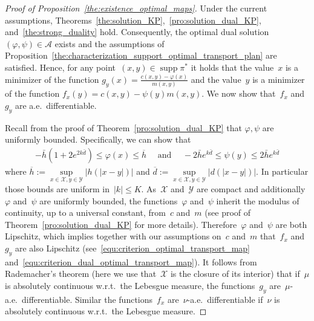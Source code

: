 \documentclass{article}
\theoremstyle{definition}
\DeclareMathOperator{\supp}{supp}
\begin{document}
\begin{proof}[Proof of Proposition~\ref{the:existence_optimal_maps}]
Under the current assumptions, Theorems~\ref{the:solution_KP},~\ref{pro:solution_dual_KP}, and~\ref{the:strong_duality} hold. Consequently, the optimal dual solution $(\varphi, \psi) \in \mathcal{A}$ exists and the assumptions of Proposition~\ref{the:characterization_support_optimal_transport_plan} are satisfied. 
Hence, for any point~$(x,y)\in \supp \pi^*$ it holds that the value~$x$ is a minimizer of the function $g_y(x) = \frac{c(x,y)- \varphi(x)}{m(x,y)}$ and the value~$y$ is a minimizer of the function $f_x(y) = c(x,y) -  \psi(y) m(x,y)$. We now show that~$f_x$ and~$g_y$ are a.e.~differentiable.\smallskip

Recall from the proof of Theorem~\ref{pro:solution_dual_KP} that $\varphi, \psi$ are uniformly bounded. Specifically, we can show that 
\begin{align}\label{equ:uniform_bounds_psi_phi}
-\bar{h}(1 + 2 e^{2k\bar{d}}) \leq \varphi (x) \leq \overline{h}  \quad \text{ and } \quad -2 \bar{h} e^{k \bar{d}}  \leq \psi(y) \leq 2 \bar{h} e^{k \bar{d}}    
\end{align} 
where $\overline{h} := \sup\limits_{x \in \mathcal{X}, y \in \mathcal{Y}} | h(|x - y|) |$ and $\overline{d} := \sup\limits_{x \in \mathcal{X}, y \in \mathcal{Y}} |d(|x - y|)|$. In particular those bounds are uniform in~$|k| \leq K$. As~$\mathcal{X}$ and~$\mathcal{Y}$ are compact and additionally~$\varphi$ and~$\psi$ are uniformly bounded, the functions~$\varphi$ and~$\psi$ inherit the modulus of continuity, up to a universal constant, from~$c$ and~$m$ (see proof of Theorem~\ref{pro:solution_dual_KP} for more details). Therefore~$\varphi$ and~$\psi$ are both Lipschitz, which implies together with our assumptions on~$c$ and~$m$ that~$f_x$ and~$g_y$ are also Lipschitz (see~\eqref{equ:criterion_optimal_transport_map} and~\eqref{equ:criterion_dual_optimal_transport_map}). It follows from Rademacher's theorem (here we use that~$\mathcal{X}$ is the closure of its interior) that if~$\mu$ is absolutely continuous w.r.t.~the Lebesgue measure, the functions~$g_y$ are~$\mu$-a.e.~differentiable. Similar the functions~$f_x$ are~$\nu$-a.e.~differentiable if~$\nu$ is absolutely continuous w.r.t.~the Lebesgue measure. \smallskip


\end{proof}
\end{document}
